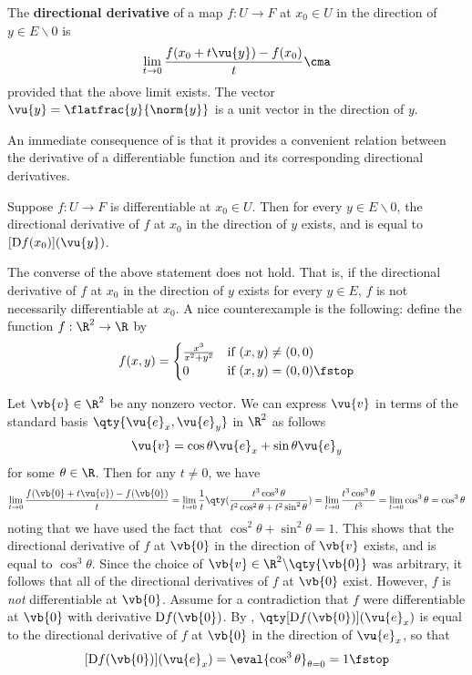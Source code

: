 \begin{definition}
  The \textbf{directional derivative} of a map \( f:U\to F \) at \( x_0\in U \) in the direction of \( y\in E\backslash\qty{0} \) is
  \[ \lim_{t\to 0}\frac{f(x_0+t\vu{y})-f(x_0)}{t}\cma \]
  provided that the above limit exists. The vector \( \vu{y}=\flatfrac{y}{\norm{y}} \) is a unit vector in the direction of \( y \).
\end{definition}

An immediate consequence of  is that it provides a convenient relation between the derivative of a differentiable function and its corresponding directional derivatives.

\begin{corollary}
  \label{thm:direction-cor}
  Suppose \( f:U\to F \) is differentiable at \( x_0\in U \). Then for every \( y\in E\backslash\qty{0} \), the directional derivative of \( f \) at \( x_0 \) in the direction of \( y \) exists, and is equal to \( [\D f(x_0)](\vu{y}) \).
\end{corollary}

The converse of the above statement does not hold. That is, if the directional derivative of \( f \) at \( x_0 \) in the direction of \( y \) exists for every \( y\in E \), \( f \) is not necessarily differentiable at \( x_0 \). A nice counterexample is the following: define the function \( f:\R^2\to\R \) by
\[ f(x,y)=
  \begin{cases}
    \frac{x^3}{x^2+y^2} &\text{if }(x,y)\neq (0,0)\\
    0 &\text{if }(x,y)=(0,0)\fstop
  \end{cases}
\]

Let \( \vb{v}\in\R^2 \) be any nonzero vector. We can express \( \vu{v} \) in terms of the standard basis \( \qty{\vu{e}_x,\vu{e}_y} \) in \( \R^2 \) as follows
\[ \vu{v}=\cos\theta\vu{e}_x+\sin\theta\vu{e}_y \]
for some \( \theta\in\R \). Then for any \( t\neq 0 \), we have
\[ \lim_{t\to 0}\frac{f(\vb{0}+t\vu{v})-f(\vb{0})}{t}=\lim_{t\to 0}\frac{1}{t}\qty(\frac{t^3\cos^3\theta}{t^2\cos^2\theta+t^2\sin^2\theta})=\lim_{t\to 0}\frac{t^3\cos^3\theta}{t^3}=\lim_{t\to 0}\cos^3\theta=\cos^3\theta \]
noting that we have used the fact that \( \cos^2\theta+\sin^2\theta=1 \). This shows that the directional derivative of \( f \) at \( \vb{0} \) in the direction of \( \vb{v} \) exists, and is equal to \( \cos^3\theta \). Since the choice of \( \vb{v}\in\R^2\backslash\qty{\vb{0}} \) was arbitrary, it follows that all of the directional derivatives of \( f \) at \( \vb{0} \) exist. However, \( f \) is \emph{not} differentiable at \( \vb{0} \). Assume for a contradiction that \( f \) were differentiable at \( \vb{0} \) with derivative \( \D f(\vb{0}) \). By , \( \qty[\D f(\vb{0})](\vu{e}_x) \) is equal to the directional derivative of \( f \) at \( \vb{0} \) in the direction of \( \vu{e}_x \), so that
\[ [\D f(\vb{0})](\vu{e}_x)=\eval{\cos^3\theta}_{\theta=0}=1\fstop \]

